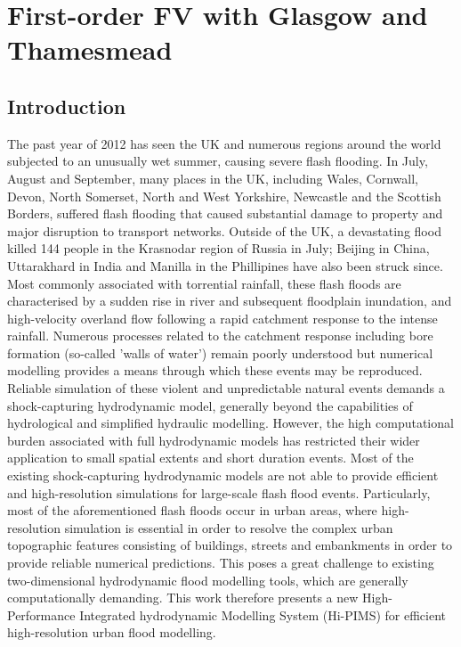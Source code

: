 \chapter{First-order FV with Glasgow and Thamesmead}

\section{Introduction}

The past year of 2012 has seen the UK and numerous regions around the world subjected to an unusually wet summer, causing severe flash flooding. In July, August and September, many places in the UK, including Wales, Cornwall, Devon, North Somerset, North and West Yorkshire, Newcastle and the Scottish Borders, suffered flash flooding that caused substantial damage to property and major disruption to transport networks. Outside of the UK, a devastating flood killed 144 people in the Krasnodar region of Russia in July; Beijing in China, Uttarakhard in India and Manilla in the Phillipines have also been struck since. Most commonly associated with torrential rainfall, these flash floods are characterised by a sudden rise in river and subsequent floodplain inundation, and high-velocity overland flow following a rapid catchment response to the intense rainfall. Numerous processes related to the catchment response including bore formation (so-called 'walls of water') remain poorly understood but numerical modelling provides a means through which these events may be reproduced. Reliable simulation of these violent and unpredictable natural events demands a shock-capturing hydrodynamic model, generally beyond the capabilities of hydrological and simplified hydraulic modelling. However, the high computational burden associated with full hydrodynamic models has restricted their wider application to small spatial extents and short duration events. Most of the existing shock-capturing hydrodynamic models are not able to provide efficient and high-resolution simulations for large-scale flash flood events. Particularly, most of the aforementioned flash floods occur in urban areas, where high-resolution simulation is essential in order to resolve the complex urban topographic features consisting of buildings, streets and embankments in order to provide reliable numerical predictions. This poses a great challenge to existing two-dimensional hydrodynamic flood modelling tools, which are generally computationally demanding. This work therefore presents a new High-Performance Integrated hydrodynamic Modelling System (Hi-PIMS) for efficient high-resolution urban flood modelling.

